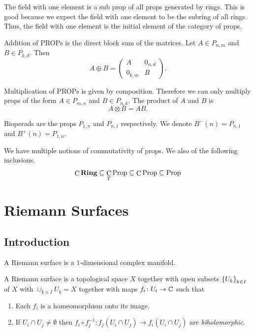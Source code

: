 \documentclass[11pt,a4paper]{article}
\DeclareMathOperator{\Prop}{Prop}
\DeclareMathOperator{\CC}{C}
\begin{document}
\begin{remark}
  The field with one element is a sub prop of all props generated by rings.
  This is good because we expect the field with one element to be the subring
  of all rings.
  Thus, the field with one element is the initial element of the category
  of props.
\end{remark}

\begin{definition}
  Addition of PROPs is the direct block sum of the matrices.
  Let $A \in P_{n,m}$ and $B \in P_{k,d}$.
  Then
  \[
    A \oplus B =
    \begin{pmatrix}
      A & 0_{n,d} \\
      0_{k,m} & B
    \end{pmatrix}.
  \]
\end{definition}

\begin{definition}
  Multiplication of PROPs is given by composition.
  Therefore we can only multiply props of the form $A \in P_{m,n}$ and
  $B \in P_{n,k}$.
  The product of $A$ and $B$ is
  \[
    A \otimes B = AB.
  \]
\end{definition}

\begin{definition}[Bioperds]
  Bioperads are the props $P_{1,n}$ and $P_{n,1}$ respectively.
  We denote $B^-(n) = P_{n,1}$ and $B^+(n) = P_{1,n}$.
\end{definition}

\begin{remark}
  We have multiple notions of commutativity of props.
  We also of the following inclusions.
  \[
    \CC\Ring \subseteq
    \CC_T\Prop \subseteq
    \CC\Prop \subseteq
    \Prop
  \]
\end{remark}

\newpage

\section{Riemann Surfaces}
\subsection{Introduction}
\begin{definition}
    A Riemann surface is a $1$-dimensional complex manifold.
\end{definition}

\begin{definition}
    A Riemann surface is a topological space $X$ together with
    open subsets $\left\{U_k\right\}_{k \in I}$ of $X$ with
    $\cup_{k \in I} U_k = X$ together with maps $f_i \colon U_i \to \mathbb{C}$
    such that
    \begin{enumerate}
        \item[(1)] Each $f_i$ is a homeomorphism onto its image.
        \item[(2)] If $U_i \cap U_j \neq \emptyset$ then 
            $f_i \circ f_j^{-1} \colon 
            f_j(U_i \cap U_j) \to f_i(U_i \cap U_j)$ are \emph{biholomorphic}.
    \end{enumerate}
\end{definition}
\end{document}

